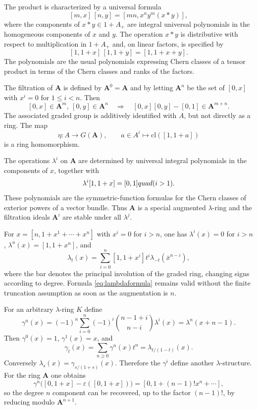 \documentclass[11pt]{article}
\theoremstyle{plain}
\theoremstyle{definition}
\theoremstyle{remark}
\providecommand{\eps}{\varepsilon}
\begin{document}
The product is characterized by a universal formula
\begin{equation}\label{eq:Aproduct}
   [m,x]\,[n,y]=[mn,x^ny^m(x*y)],
\end{equation}
where the components of $x*y\in1+A_+$ are integral universal polynomials in the homogeneous components of $x$ and $y$. The operation $x*y$ is distributive with respect to multiplication in $1+A_+$ and, on linear factors, is specified by
\begin{equation}\label{eq:lineargraded}
   [1,1+x]\,[1,1+y]=[1,1+x+y].
\end{equation}
The polynomials are the usual polynomials expressing Chern classes of a tensor product in terms of the Chern classes and ranks of the factors.

The filtration of $\mathbf A$ is defined by $\mathbf A^0=\mathbf A$ and by letting $\mathbf A^n$ be the set of $[0,x]$ with $x^i=0$ for $1\leq i<n$. Then
\[
   [0,x]\in\mathbf A^m,
   \ [0,y]\in\mathbf A^n
   \quad\Longrightarrow\quad
   [0,x][0,y]-[0,1]\in\mathbf A^{m+n}.
\]
The associated graded group is additively identified with $A$, but not directly as a ring. The map
\[
   \eta:A\to G(\mathbf A),\qquad
   a\in A^i\longmapsto \mathrm{cl}([1,1+a])
\]
is a ring homomorphism.

The operations $\lambda^i$ on $\mathbf A$ are determined by universal integral polynomials in the components of $x$, together with
\[
   \lambda^i[1,1+x]=[0,1]\\quad(i>1).
\]
These polynomials are the symmetric-function formulas for the Chern classes of exterior powers of a vector bundle. Thus $\mathbf A$ is a special augmented $\lambda$-ring and the filtration ideals $\mathbf A^i$ are stable under all $\lambda^j$.

For $x=[n,1+x^1+\cdots+x^n]$ with $x^i=0$ for $i>n$, one has $\lambda^i(x)=0$ for $i>n$, $\lambda^n(x)=[1,1+x^n]$, and
\begin{equation}\label{eq:lambdaformula}
   \lambda_t(x)=\sum_{i=0}^n[1,1+x^i]t^i\lambda_{-t}(\bar x^{n-i}),
\end{equation}
where the bar denotes the principal involution of the graded ring, changing signs according to degree. Formula \eqref{eq:lambdaformula} remains valid without the finite truncation assumption as soon as the augmentation is $n$.

For an arbitrary $\lambda$-ring $K$ define
\begin{equation}\label{eq:gammaops}
   \gamma^n(x)=(-1)^n\sum_{i=0}^n(-1)^i
   \binom{n-1+i}{n-i}\lambda^i(x)
   =\lambda^n(x+n-1).
\end{equation}
Then $\gamma^0(x)=1$, $\gamma^1(x)=x$, and
\[
   \gamma_t(x)=\sum_{n\geq 0}\gamma^n(x)t^n
             =\lambda_{t/(1-t)}(x).
\]
Conversely $\lambda_s(x)=\gamma_{s/(1+s)}(x)$. Therefore the $\gamma^i$ define another $\lambda$-structure. For the ring $\mathbf A$ one obtains
\begin{equation}\label{eq:gammafiltration}
\gamma^n\bigl([0,1+x]-\eps([0,1+x])\bigr)
   =[0,1+(n-1)!x^n+\cdots],
\end{equation}
so the degree $n$ component can be recovered, up to the factor $(n-1)!$, by reducing modulo $\mathbf A^{n+1}$.
\end{document}
